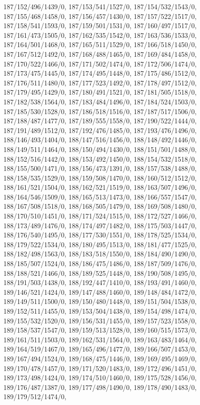 {187/152/496/1439/0,%
187/153/541/1527/0,%
187/154/532/1543/0,%
187/155/468/1458/0,%
187/156/457/1430/0,%
187/157/522/1517/0,%
187/158/541/1593/0,%
187/159/501/1531/0,%
187/160/497/1517/0,%
187/161/473/1505/0,%
187/162/535/1542/0,%
187/163/536/1533/0,%
187/164/501/1468/0,%
187/165/511/1529/0,%
187/166/518/1450/0,%
187/167/512/1492/0,%
187/168/488/1465/0,%
187/169/484/1458/0,%
187/170/522/1466/0,%
187/171/502/1474/0,%
187/172/506/1474/0,%
187/173/475/1445/0,%
187/174/495/1448/0,%
187/175/486/1512/0,%
187/176/511/1480/0,%
187/177/523/1492/0,%
187/178/497/1512/0,%
187/179/495/1429/0,%
187/180/491/1521/0,%
187/181/505/1518/0,%
187/182/538/1564/0,%
187/183/484/1496/0,%
187/184/524/1503/0,%
187/185/530/1528/0,%
187/186/518/1516/0,%
187/187/517/1506/0,%
187/188/487/1477/0,%
187/189/555/1558/0,%
187/190/522/1444/0,%
187/191/489/1512/0,%
187/192/476/1485/0,%
187/193/476/1496/0,%
188/146/493/1404/0,%
188/147/516/1456/0,%
188/148/492/1446/0,%
188/149/511/1464/0,%
188/150/494/1430/0,%
188/151/501/1488/0,%
188/152/516/1442/0,%
188/153/492/1450/0,%
188/154/532/1518/0,%
188/155/500/1471/0,%
188/156/473/1391/0,%
188/157/538/1488/0,%
188/158/535/1529/0,%
188/159/508/1470/0,%
188/160/512/1512/0,%
188/161/521/1504/0,%
188/162/521/1519/0,%
188/163/507/1496/0,%
188/164/546/1509/0,%
188/165/513/1473/0,%
188/166/557/1547/0,%
188/167/508/1518/0,%
188/168/505/1479/0,%
188/169/508/1480/0,%
188/170/510/1451/0,%
188/171/524/1515/0,%
188/172/527/1466/0,%
188/173/489/1476/0,%
188/174/497/1482/0,%
188/175/503/1447/0,%
188/176/540/1495/0,%
188/177/530/1551/0,%
188/178/525/1534/0,%
188/179/522/1534/0,%
188/180/495/1513/0,%
188/181/477/1525/0,%
188/182/498/1563/0,%
188/183/518/1550/0,%
188/184/490/1490/0,%
188/185/507/1524/0,%
188/186/475/1486/0,%
188/187/509/1476/0,%
188/188/521/1466/0,%
188/189/525/1448/0,%
188/190/508/1495/0,%
188/191/503/1438/0,%
188/192/447/1410/0,%
188/193/491/1460/0,%
189/146/521/1424/0,%
189/147/488/1460/0,%
189/148/484/1472/0,%
189/149/511/1500/0,%
189/150/480/1448/0,%
189/151/504/1538/0,%
189/152/511/1455/0,%
189/153/504/1438/0,%
189/154/498/1474/0,%
189/155/532/1520/0,%
189/156/531/1455/0,%
189/157/523/1558/0,%
189/158/537/1547/0,%
189/159/513/1528/0,%
189/160/515/1573/0,%
189/161/511/1503/0,%
189/162/531/1564/0,%
189/163/483/1464/0,%
189/164/519/1467/0,%
189/165/496/1477/0,%
189/166/507/1453/0,%
189/167/494/1524/0,%
189/168/475/1446/0,%
189/169/495/1469/0,%
189/170/478/1457/0,%
189/171/520/1483/0,%
189/172/496/1451/0,%
189/173/498/1424/0,%
189/174/510/1460/0,%
189/175/528/1456/0,%
189/176/487/1387/0,%
189/177/498/1490/0,%
189/178/490/1483/0,%
189/179/512/1474/0,%
}

